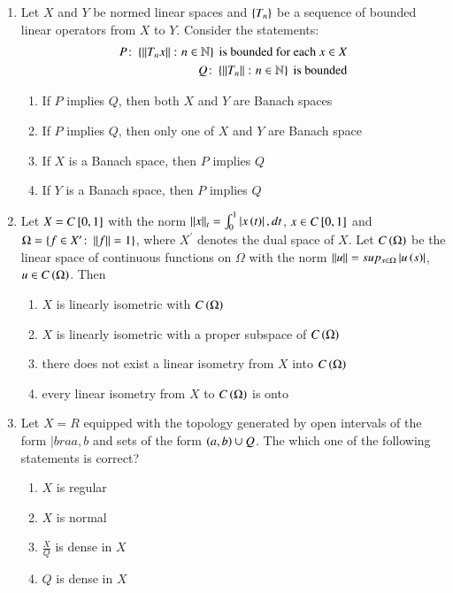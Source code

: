 \documentclass[journal]{IEEEtran}
\begin{document}
\begin{enumerate}
\item Let $X$ and $Y$ be normed linear spaces and $\left\{T_n\right\}$ be a sequence of bounded linear operators from $X$ to $Y$. Consider the statements:
\begin{align*}
    P \colon \left\{\left\vert\left\vert T_n x\right\vert\right\vert \colon n \in \mathbb{N}\right\} \text{ is bounded for each } x \in X\\
    Q \colon \left\{\left\vert\left\vert T_n\right\vert\right\vert \colon n \in \mathbb{N}\right\} \text{ is bounded}
\end{align*}
    \begin{enumerate}
        \item If $P$ implies $Q$, then both $X$ and $Y$ are Banach spaces
        \item If $P$ implies $Q$, then only one of $X$ and $Y$ are Banach space
        \item If $X$ is a Banach space, then $P$ implies $Q$
        \item If $Y$ is a Banach space, then $P$ implies $Q$
    \end{enumerate}

\item Let $X = C{}\left[0,1\right]$ with the norm $\left\vert\left\vert x\right\vert\right\vert_t  = \int_0^1 \left\vert x\left(t\right)\right\vert, dt$, $x \in C {}\left[0,1\right]$ and $\Omega = \left\{f \in X^{\prime} \colon \left\vert\left\vert f\right\vert\right\vert = 1\right\}$, where $X^{\prime}$ denotes the dual space of $X$. Let $C\left(\Omega\right)$ be the linear space of continuous functions on $\Omega$ with the norm $\left\vert\left\vert u\right\vert\right\vert = sup _{s \in \Omega} \left\vert u\left(s\right)\right\vert$, $u \in C\left(\Omega\right)$. Then
    \begin{enumerate}
        \item $X$ is linearly isometric with $C\left(\Omega\right)$
        \item $X$ is linearly isometric with a proper subspace of $C\left(\Omega\right)$ 
        \item there does not exist a linear isometry from $X$ into $C\left(\Omega\right)$
        \item every linear isometry from $X$ to $C\left(\Omega\right)$ is onto
    \end{enumerate}

\item Let $X = R$ equipped with the topology generated by open intervals of the form $|bra
a,b$ and sets of the form $\left(a,b\right) \cup Q$. The which one of the following statements is correct?
\begin{multicols}{2}
    \begin{enumerate}
        \item $X$ is regular
        \item $X$ is normal
        \item $\frac{X}{Q}$ is dense in $X$
        \item $Q$ is dense in $X$
    \end{enumerate}
\end{multicols}


\end{enumerate}
\end{document}
